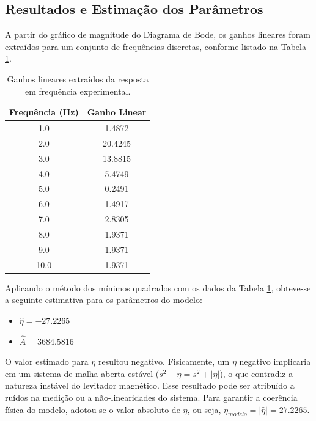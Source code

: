 \subsection{Resultados e Estimação dos Parâmetros}

A partir do gráfico de magnitude do Diagrama de Bode, os ganhos lineares foram extraídos para um conjunto de frequências discretas, conforme listado na Tabela \ref{tab:ganhos}.

\begin{table}[ht!]
    \centering
    \caption{Ganhos lineares extraídos da resposta em frequência experimental.}
    \label{tab:ganhos}
    \begin{tabular}{cc}
        \toprule
        \textbf{Frequência (Hz)} & \textbf{Ganho Linear} \\
        \midrule
        1.0                      & 1.4872                \\
        2.0                      & 20.4245               \\
        3.0                      & 13.8815               \\
        4.0                      & 5.4749                \\
        5.0                      & 0.2491                \\
        6.0                      & 1.4917                \\
        7.0                      & 2.8305                \\
        8.0                      & 1.9371                \\
        9.0                      & 1.9371                \\
        10.0                     & 1.9371                \\
        \bottomrule
    \end{tabular}
\end{table}

Aplicando o método dos mínimos quadrados com os dados da Tabela \ref{tab:ganhos}, obteve-se a seguinte estimativa para os parâmetros do modelo:
\begin{itemize}
    \item $\hat{\eta} = -27.2265$
    \item $\hat{A} = 3684.5816$
\end{itemize}
O valor estimado para $\eta$ resultou negativo. Fisicamente, um $\eta$ negativo implicaria em um sistema de malha aberta estável ($s^2 - \eta = s^2 + |\eta|$), o que contradiz a natureza instável do levitador magnético. Esse resultado pode ser atribuído a ruídos na medição ou a não-linearidades do sistema. Para garantir a coerência física do modelo, adotou-se o valor absoluto de $\eta$, ou seja, $\eta_{modelo} = |\hat{\eta}| = 27.2265$.

